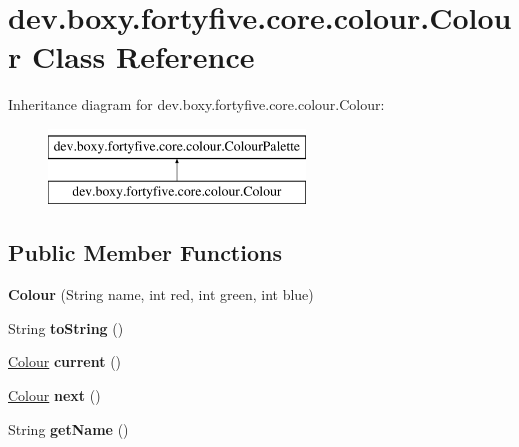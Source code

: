 \hypertarget{classdev_1_1boxy_1_1fortyfive_1_1core_1_1colour_1_1_colour}{
\section{dev.boxy.fortyfive.core.colour.Colour Class Reference}
\label{d1/de3/classdev_1_1boxy_1_1fortyfive_1_1core_1_1colour_1_1_colour}
}
Inheritance diagram for dev.boxy.fortyfive.core.colour.Colour:\begin{figure}[H]
\begin{center}
\leavevmode
\includegraphics[height=2.000000cm]{d1/de3/classdev_1_1boxy_1_1fortyfive_1_1core_1_1colour_1_1_colour}
\end{center}
\end{figure}
\subsection*{Public Member Functions}
\begin{DoxyCompactItemize}
\item 
\hypertarget{classdev_1_1boxy_1_1fortyfive_1_1core_1_1colour_1_1_colour_a74e1f1d9b3caea2c66ab09ec005724bd}{
{\bfseries Colour} (String name, int red, int green, int blue)}
\label{d1/de3/classdev_1_1boxy_1_1fortyfive_1_1core_1_1colour_1_1_colour_a74e1f1d9b3caea2c66ab09ec005724bd}

\item 
\hypertarget{classdev_1_1boxy_1_1fortyfive_1_1core_1_1colour_1_1_colour_a65bfe155a61d9e8a92fa6bc86ea66bc0}{
String {\bfseries toString} ()}
\label{d1/de3/classdev_1_1boxy_1_1fortyfive_1_1core_1_1colour_1_1_colour_a65bfe155a61d9e8a92fa6bc86ea66bc0}

\item 
\hypertarget{classdev_1_1boxy_1_1fortyfive_1_1core_1_1colour_1_1_colour_adf592df49babadd8f8d0a0cc7555f99a}{
\hyperlink{classdev_1_1boxy_1_1fortyfive_1_1core_1_1colour_1_1_colour}{Colour} {\bfseries current} ()}
\label{d1/de3/classdev_1_1boxy_1_1fortyfive_1_1core_1_1colour_1_1_colour_adf592df49babadd8f8d0a0cc7555f99a}

\item 
\hypertarget{classdev_1_1boxy_1_1fortyfive_1_1core_1_1colour_1_1_colour_a97d2377be27824c8bd314be426ff6712}{
\hyperlink{classdev_1_1boxy_1_1fortyfive_1_1core_1_1colour_1_1_colour}{Colour} {\bfseries next} ()}
\label{d1/de3/classdev_1_1boxy_1_1fortyfive_1_1core_1_1colour_1_1_colour_a97d2377be27824c8bd314be426ff6712}

\item 
\hypertarget{classdev_1_1boxy_1_1fortyfive_1_1core_1_1colour_1_1_colour_aeadab7319b7e125423e2439d28489a18}{
String {\bfseries getName} ()}
\label{d1/de3/classdev_1_1boxy_1_1fortyfive_1_1core_1_1colour_1_1_colour_aeadab7319b7e125423e2439d28489a18}

\end{DoxyCompactItemize}
